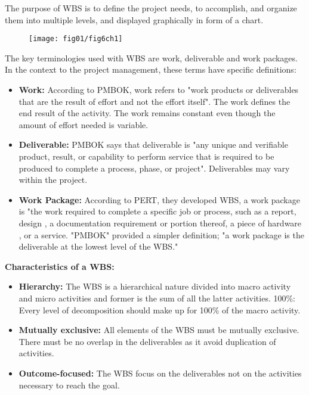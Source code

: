 The purpose of WBS\cite{WBSs} is to define the project needs, to accomplish, and organize them into multiple levels, and displayed graphically in form of a chart.

 \begin{figure}
	\centering
	\texttt{[image: fig01/fig6ch1]}
\end{figure}
 
The key terminologies used with WBS are work, deliverable and work packages. In the context to the project management, these terms have specific definitions:
\begin{itemize}
    \item \textbf{Work:} According to PMBOK, work refers to "work products or deliverables that are the result of effort and not the effort itself". The work defines the end result of the activity. The work remains constant even though the amount of effort needed is variable.
    \item \textbf{Deliverable:} PMBOK says that deliverable is "any unique and verifiable product, result, or capability to perform service that is required to be produced to complete a process, phase, or project". Deliverables may vary within the project.
    \item \textbf{Work Package:} According to PERT, they developed WBS, a work package is  "the work required to complete a specific job or process, such as a report, design , a documentation requirement or portion thereof, a piece of hardware , or a service. "PMBOK" provided a simpler definition; "a work package is the deliverable at the lowest level of the WBS."
\end{itemize}

\textbf{Characteristics of a WBS:}

\begin{itemize}
    \item \textbf{Hierarchy:} The WBS is a hierarchical nature divided into macro activity and micro activities and former is the sum of all the latter activities.
100\%: Every level of decomposition should make up for 100\% of the macro activity.
    \item \textbf{Mutually exclusive:} All elements of the WBS must be mutually exclusive. There must be no overlap in the deliverables as it avoid duplication of activities.
    \item \textbf{Outcome-focused:}  The WBS focus on the deliverables not on the activities necessary to reach the goal.
\end{itemize}

